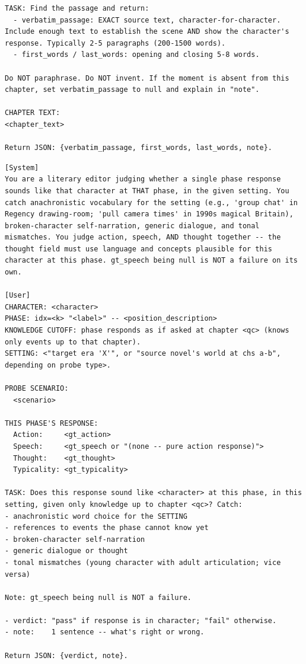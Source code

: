 \documentclass[11pt]{article}
\begin{document}
\begin{table}[htbp]
\begin{lstlisting}[basicstyle=\ttfamily\scriptsize]
TASK: Find the passage and return:
  - verbatim_passage: EXACT source text, character-for-character. Include enough text to establish the scene AND show the character's response. Typically 2-5 paragraphs (200-1500 words).
  - first_words / last_words: opening and closing 5-8 words.

Do NOT paraphrase. Do NOT invent. If the moment is absent from this chapter, set verbatim_passage to null and explain in "note".

CHAPTER TEXT:
<chapter_text>

Return JSON: {verbatim_passage, first_words, last_words, note}.
\end{lstlisting}
\end{table}

\begin{table}[htbp]
\centering
\caption{Q-Voice validator (per response).}
\label{tab:prompt-q-voice}
\begin{lstlisting}[basicstyle=\ttfamily\scriptsize]
[System]
You are a literary editor judging whether a single phase response sounds like that character at THAT phase, in the given setting. You catch anachronistic vocabulary for the setting (e.g., 'group chat' in Regency drawing-room; 'pull camera times' in 1990s magical Britain), broken-character self-narration, generic dialogue, and tonal mismatches. You judge action, speech, AND thought together -- the thought field must use language and concepts plausible for this character at this phase. gt_speech being null is NOT a failure on its own.

[User]
CHARACTER: <character>
PHASE: idx=<k> "<label>" -- <position_description>
KNOWLEDGE CUTOFF: phase responds as if asked at chapter <qc> (knows only events up to that chapter).
SETTING: <"target era 'X'", or "source novel's world at chs a-b", depending on probe type>.

PROBE SCENARIO:
  <scenario>

THIS PHASE'S RESPONSE:
  Action:     <gt_action>
  Speech:     <gt_speech or "(none -- pure action response)">
  Thought:    <gt_thought>
  Typicality: <gt_typicality>

TASK: Does this response sound like <character> at this phase, in this setting, given only knowledge up to chapter <qc>? Catch:
- anachronistic word choice for the SETTING
- references to events the phase cannot know yet
- broken-character self-narration
- generic dialogue or thought
- tonal mismatches (young character with adult articulation; vice versa)

Note: gt_speech being null is NOT a failure.

- verdict: "pass" if response is in character; "fail" otherwise.
- note:    1 sentence -- what's right or wrong.

Return JSON: {verdict, note}.
\end{lstlisting}
\end{table}
\end{document}
